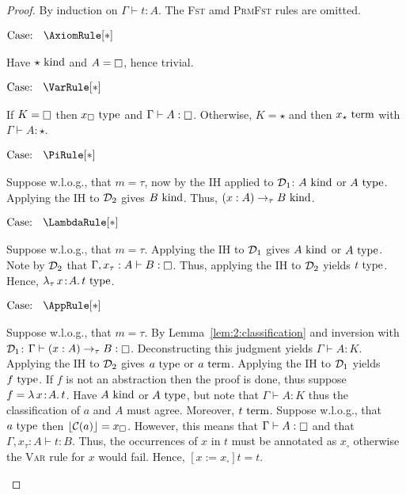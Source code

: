 \begin{proof}
    By induction on $\Gamma \vdash t : A$.
    The \textsc{Fst} amd \textsc{PrmFst} rules are omitted.

    $\text{Case: }\begin{array}{c} \AxiomRule[*] \end{array}$
    \begin{proofcase}
        Have $\star~\textnormal{kind}$ and $A = \kind$, hence trivial.
    \end{proofcase}

    $\text{Case: }\begin{array}{c} \VarRule[*] \end{array}$
    \begin{proofcase}
        If $K = \kind$ then $x_\square~\textnormal{type}$ and $\Gamma \vdash A : \kind$.
        Otherwise, $K = \star$ and then $x_\star~\textnormal{term}$ with $\Gamma \vdash A : \star$.
    \end{proofcase}

    $\text{Case: }\begin{array}{c} \PiRule[*] \end{array}$
    \begin{proofcase}
        Suppose w.l.o.g., that $m = \tau$, now by the IH applied to $\mathcal{D}_{1}$: $A~\textnormal{kind}$ or $A~\textnormal{type}$.
        Applying the IH to $\mathcal{D}_{2}$ gives $B~\textnormal{kind}$.
        Thus, $(x : A) \to_\tau B~\textnormal{kind}$.
    \end{proofcase}

    $\text{Case: }\begin{array}{c} \LambdaRule[*] \end{array}$
    \begin{proofcase}
        Suppose w.l.o.g., that $m = \tau$.
        Applying the IH to $\mathcal{D}_{1}$ gives $A~\textnormal{kind}$ or $A~\textnormal{type}$.
        Note by $\mathcal{D}_{2}$ that $\Gamma, x_\tau : A \vdash B : \kind$.
        Thus, applying the IH to $\mathcal{D}_{2}$ yields $t~\textnormal{type}$.
        Hence, ${\lambda_\tau}\, x\! : \! A.\, t~\textnormal{type}$.
    \end{proofcase}

    $\text{Case: }\begin{array}{c} \AppRule[*] \end{array}$
    \begin{proofcase}
        Suppose w.l.o.g., that $m = \tau$.
        By Lemma~\ref{lem:2:classification} and inversion with $\mathcal{D}_{1}$: $\Gamma \vdash (x : A) \to_\tau B : \kind$.
        Deconstructing this judgment yields $\Gamma \vdash A : K$.
        Applying the IH to $\mathcal{D}_{2}$ gives $a~\textnormal{type}$ or $a~\textnormal{term}$.
        Applying the IH to $\mathcal{D}_{1}$ yields $f~\textnormal{type}$.
        If $f$ is not an abstraction then the proof is done, thus suppose $f = {\lambda}\, x\! : \! A.\, t$.
        Have $A~\textnormal{kind}$ or $A~\textnormal{type}$, but note that $\Gamma \vdash A : K$ thus the classification of $a$ and $A$ must agree.
        Moreover, $t~\textnormal{term}$.
        Suppose w.l.o.g., that $a~\textnormal{type}$ then $\lfloor \mathcal{C}(a) \rfloor = x_\square$.
        However, this means that $\Gamma \vdash A : \kind$ and that $\Gamma, x_\tau : A \vdash t : B$.
        Thus, the occurrences of $x$ in $t$ must be annotated as $x_\square$ otherwise the \textsc{Var} rule for $x$ would fail.
        Hence, $[x := x_\square]t = t$.
    \end{proofcase}


\end{proof}
